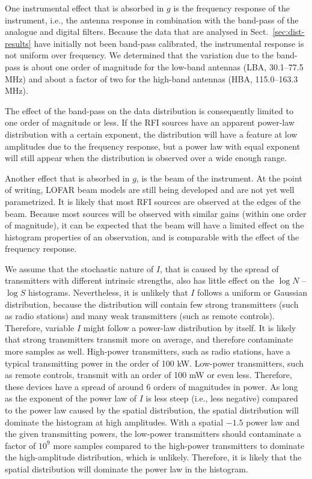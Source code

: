 \documentclass[useAMS,usenatbib]{mn2e}
\begin{document}
One instrumental effect that is absorbed in $g$ is the frequency response of the instrument, i.e., the antenna response in combination with the band-pass of the analogue and digital filters. Because the data that are analysed in Sect.~\ref{sec:dist-results} have initially not been band-pass calibrated, the instrumental response is not uniform over frequency. We determined that the variation due to the band-pass is about one order of magnitude for the low-band antennas (LBA, 30.1--77.5 MHz) and about a factor of two for the high-band antennas (HBA, 115.0--163.3 MHz).

The effect of the band-pass on the data distribution is consequently limited to one order of magnitude or less. If the RFI sources have an apparent power-law distribution with a certain exponent, the distribution will have a feature at low amplitudes due to the frequency response, but a power law with equal exponent will still appear when the distribution is observed over a wide enough range.

Another effect that is absorbed in $g$, is the beam of the instrument. At the point of writing, LOFAR beam models are still being developed and are not yet well parametrized. It is likely that most RFI sources are observed at the edges of the beam. Because most sources will be observed with similar gains (within one order of magnitude), it can be expected that the beam will have a limited effect on the histogram properties of an observation, and is comparable with the effect of the frequency response.

We assume that the stochastic nature of $I$, that is caused by the spread of transmitters with different intrinsic strengths, also has little effect on the $\log N$ -- $\log S$ histograms. Nevertheless, it is unlikely that $I$ follows a uniform or Gaussian distribution, because the distribution will contain few strong transmitters (such as radio stations) and many weak transmitters (such as remote controls). Therefore, variable $I$ might follow a power-law distribution by itself. It is likely that strong transmitters transmit more on average, and therefore contaminate more samples as well. High-power transmitters, such as radio stations, have a typical transmitting power in the order of 100 kW. Low-power transmitters, such as remote controls, transmit with an order of 100 mW or even less. Therefore, these devices have a spread of around 6 orders of magnitudes in power. As long as the exponent of the power law of $I$ is less steep (i.e., less negative) compared to the power law caused by the spatial distribution, the spatial distribution will dominate the histogram at high amplitudes. With a spatial $-1.5$ power law and the given transmitting powers, the low-power transmitters should contaminate a factor of $10^9$ more samples compared to the high-power transmitters to dominate the high-amplitude distribution, which is unlikely. Therefore, it is likely that the spatial distribution will dominate the power law in the histogram.
\end{document}
